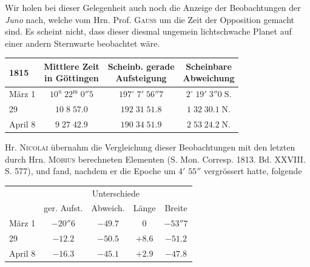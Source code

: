 \par\indent Wir holen bei dieser Gelegenheit auch noch die Anzeige der Beobachtungen der \emph{Juno} nach,
welche vom Hrn. Prof. \textsc{Gauss} um die Zeit der Opposition gemacht sind. Es scheint nicht, dass dieser
diesmal ungemein lichtschwache Planet auf einer andern Sternwarte beobachtet wäre.

\begin{center}\fontsize{10}{12}\selectfont\setlength{\tabcolsep}{5pt}\renewcommand{\arraystretch}{1.15}\begin{tabular}{l|c|c|c}
1815 & \shortstack{Mittlere Zeit\\in Göttingen} & \shortstack{Scheinb. gerade\\Aufsteigung} & \shortstack{Scheinbare\\Abweichung}\\\hline
März 1 & $10^{\mathrm u}\;22^{\mathrm m}\;0''5$ & $197^\circ\;7'\;56''7$ & $2^\circ\;19'\;3''0\;\mathrm{S.}$\\
29 & $10\;8\;57.0$ & $192\;31\;51.8$ & $1\;32\;30.1\;\mathrm{N.}$\\
April 8 & $9\;27\;42.9$ & $190\;34\;51.9$ & $2\;53\;24.2\;\mathrm{N.}$\\
\end{tabular}\end{center}

\par\indent Hr. \textsc{Nicolai} übernahm die Vergleichung dieser Beobachtungen mit den letzten durch Hrn. \textsc{Möbius}
berechneten Elementen (S. Mon. Corresp. 1813. Bd. XXVIII. S. 577), und fand, nachdem er die Epoche
um $4'$ $55''$ vergrössert hatte, folgende

\begin{center}
\fontsize{10}{12}\selectfont\setlength{\tabcolsep}{6pt}\renewcommand{\arraystretch}{1.15}\begin{tabular}{l | c | c | c | c}
& \multicolumn{4}{c}{Unterschiede} \\
& ger. Aufst. & Abweich. & Länge & Breite \\
\hline
März 1 & $-20''6$ & $-49.7$ & $0$ & $-53''7$ \\
29 & $-12.2$ & $-50.5$ & $+8.6$ & $-51.2$ \\
April 8 & $-16.3$ & $-45.1$ & $+2.9$ & $-47.8$ \\
\end{tabular}
\end{center}

